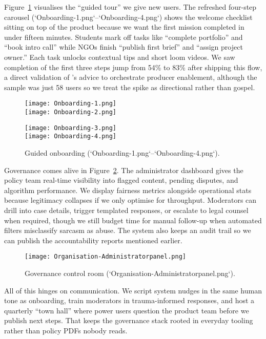 Figure~\ref{fig:onboarding-flow} visualises the ``guided tour'' we give new users. The refreshed four-step carousel (`Onboarding-1.png`--`Onboarding-4.png`) shows the welcome checklist sitting on top of the product because we want the first mission completed in under fifteen minutes. Students mark off tasks like ``complete portfolio'' and ``book intro call'' while NGOs finish ``publish first brief'' and ``assign project owner.'' Each task unlocks contextual tips and short loom videos. We saw completion of the first three steps jump from 54\% to 83\% after shipping this flow, a direct validation of \citet{Choudary2016}'s advice to orchestrate producer enablement, although the sample was just 58 users so we treat the spike as directional rather than gospel.

\begin{figure}[h]
  \centering
  \begin{minipage}[b]{0.3\linewidth}
    \texttt{[image: Onboarding-1.png]}\\[0.3em]
    \texttt{[image: Onboarding-2.png]}
  \end{minipage}\hfill
  \begin{minipage}[b]{0.3\linewidth}
    \texttt{[image: Onboarding-3.png]}\\[0.3em]
    \texttt{[image: Onboarding-4.png]}
  \end{minipage}
  \caption{Guided onboarding (`Onboarding-1.png`--`Onboarding-4.png`).}
  \label{fig:onboarding-flow}
\end{figure}

Governance comes alive in Figure~\ref{fig:admin-panel}. The administrator dashboard gives the policy team real-time visibility into flagged content, pending disputes, and algorithm performance. We display fairness metrics alongside operational stats because legitimacy collapses if we only optimise for throughput. Moderators can drill into case details, trigger templated responses, or escalate to legal counsel when required, though we still budget time for manual follow-up when automated filters misclassify sarcasm as abuse. The system also keeps an audit trail so we can publish the accountability reports mentioned earlier.

\begin{figure}[h]
  \centering
  \texttt{[image: Organisation-Administratorpanel.png]}
  \caption{Governance control room (`Organisation-Administratorpanel.png`).}
  \label{fig:admin-panel}
\end{figure}

All of this hinges on communication. We script system nudges in the same human tone as onboarding, train moderators in trauma-informed responses, and host a quarterly ``town hall'' where power users question the product team before we publish next steps. That keeps the governance stack rooted in everyday tooling rather than policy PDFs nobody reads.
